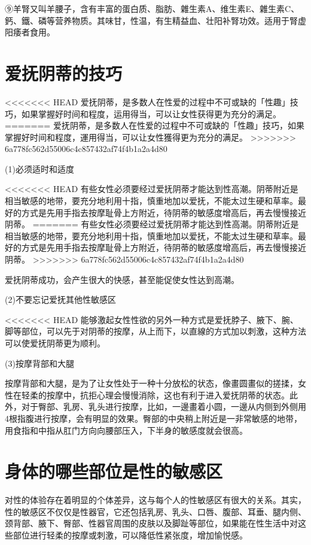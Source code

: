 \documentclass[12pt,UTF8]{ctexbook}
\begin{document}
⑨羊腎又叫羊腰子，含有丰富的蛋白质、脂肪、雜生素A、维生素E、雜生素C、鈣、鐵、磷等营养物质。其味甘，性温，有生精益血、壮阳补腎功效。适用于腎虚阳痿者食用。

\section{爱抚阴蒂的技巧}

<<<<<<< HEAD
爱抚阴蒂，是多数人在性爱的过程中不可或缺的「性趣」技巧，如果掌握好时间和程度，运用得当，可以让女性获得更为充分的满足。
=======
爱抚阴蒂，是多数人在性爱的过程中不可或缺的「性趣」技巧，如果掌握好时间和程度，運用得当，可以让女性獲得更为充分的满足。
>>>>>>> 6a778fc562d55006c4c857432af74f4b1a2a4d80

(1)必须适时和适度

<<<<<<< HEAD
有些女性必须要经过爱抚阴蒂才能达到性高潮。阴蒂附近是相当敏感的地带，要充分地利用十指，慎重地加以爱抚，不能太过生硬和草率。最好的方式是先用手指去按摩耻骨上方附近，待阴蒂的敏感度增高后，再去慢慢接近阴蒂。
=======
有些女性必须要经过爱抚阴蒂才能达到性高潮。阴蒂附近是相当敏感的地带，要充分地利用十指，慎重地加以爱抚，不能太过生硬和草率。最好的方式是先用手指去按摩耻骨上方附近，待阴蒂的敏感度增高后，再去慢慢接近阴蒂。
>>>>>>> 6a778fc562d55006c4c857432af74f4b1a2a4d80

爱抚阴蒂成功，会产生很大的快感，甚至能促使女性达到高潮。

(2)不要忘记爱抚其他性敏感区

<<<<<<< HEAD
能够激起女性性欲的另外一种方式是爱抚脖子、腋下、腕、脚等部位，可以先于对阴蒂的按摩，从上而下，以直線的方式加以刺激，这种方法可以使爱抚阴蒂更为顺利。

(3)按摩背部和大腿

按摩背部和大腿，是为了让女性处于一种十分放松的状态，像畫圆畫似的搓揉，女性在轻柔的按摩中，抗拒心理会慢慢消除，这也有利于进入爱抚阴蒂的状态。此外，对于臀部、乳房、乳头进行按摩，比如，一邊畫着小圆，一邊从内侧到外侧用4根指腹进行按摩，会有明显的效果。臀部的中央稍上附近是一非常敏感的地带，用食指和中指从肛门方向向腰部压入，下半身的敏感度就会很高。

\section{身体的哪些部位是性的敏感区}

对性的体验存在着明显的个体差异，这与每个人的性敏感区有很大的关系。其实，性的敏感区不仅仅是性器官，它还包括乳房、乳头、口唇、腹部、耳垂、腿内侧、颈背部、腋下、臀部、性器官周围的皮肤以及脚趾等部位，如果能在性生活中对这些部位进行轻柔的按摩或刺激，可以降低性紧张度，增加愉悦感。
\end{document}
